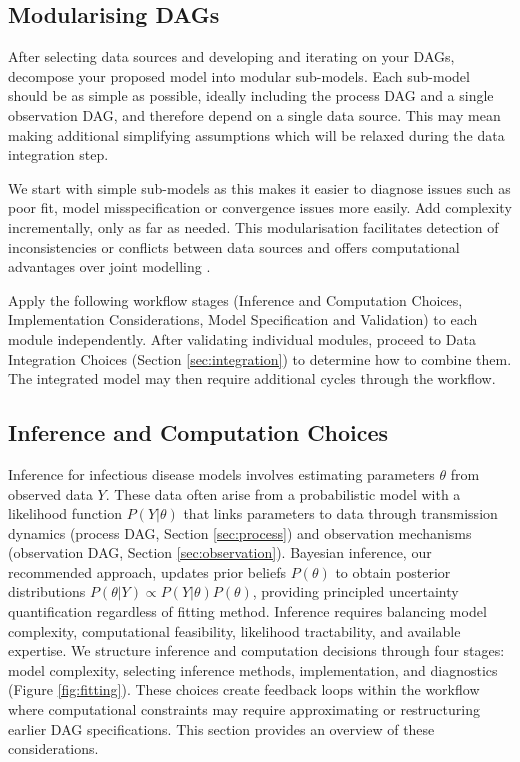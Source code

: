\documentclass{article}
\begin{document}
\subsection{Modularising DAGs} \label{sec:modularise}

After selecting data sources and developing and iterating on your DAGs, decompose your proposed model into modular sub-models.
Each sub-model should be as simple as possible, ideally including the process DAG and a single observation DAG, and therefore depend on a single data source.
This may mean making additional simplifying assumptions which will be relaxed during the data integration step.

We start with simple sub-models as this makes it easier to diagnose issues such as poor fit, model misspecification or convergence issues more easily.
Add complexity incrementally, only as far as needed.
This modularisation facilitates detection of inconsistencies or conflicts between data sources \citep{presanis2013conflict,manderson2023combining} and offers computational advantages over joint modelling \citep{deangelis2018analysing,goudie2019joining,gelman2020bayesian,nicholson2022interoperability}.

Apply the following workflow stages (Inference and Computation Choices, Implementation Considerations, Model Specification and Validation) to each module independently.
After validating individual modules, proceed to Data Integration Choices (Section \ref{sec:integration}) to determine how to combine them.
The integrated model may then require additional cycles through the workflow.

\subsection{Inference and Computation Choices}\label{sec:fitting}

Inference for infectious disease models involves estimating parameters $\theta$ from observed data $Y$.
 These data often arise from a probabilistic model with a likelihood function $P(Y |
  \theta)$ that links parameters to data through transmission dynamics (process DAG, Section \ref{sec:process}) and observation mechanisms (observation DAG, Section \ref{sec:observation}).
Bayesian inference, our recommended approach, updates prior beliefs $P(\theta)$ to obtain posterior distributions $P(\theta | Y) \propto P(Y|\theta) P(\theta)$, providing principled uncertainty quantification regardless of fitting method.
Inference requires balancing model complexity, computational feasibility, likelihood tractability, and available expertise.
We structure inference and computation decisions through four stages: model complexity, selecting inference methods, implementation, and diagnostics (Figure \ref{fig:fitting}). 
These choices create feedback loops within the workflow where computational constraints may require approximating or restructuring earlier DAG specifications.
This section provides an overview of these considerations.
\end{document}
